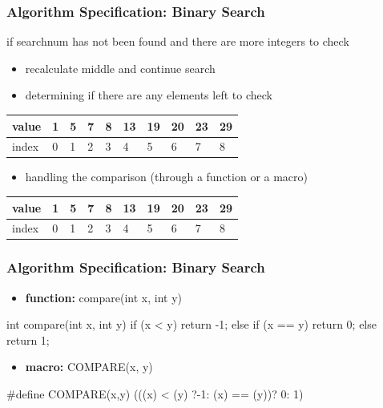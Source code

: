 \documentclass[newPxFont,sthlmFooter,nooffset]{beamer}
\begin{document}
\begin{frame}[t]
	\frametitle{Algorithm Specification: Binary Search}
	if searchnum has not been found
	and there are more integers to check
	\begin{itemize}
		\item recalculate middle and continue search
		\item determining if there are any elements left to check
	\end{itemize}
\begin{center}
	\begin{tabular}{| l | l | l | l | l | l | l | l | l | l |}
		\hline
		value & 1 & 5 & 7 & 8 & 13 & \cellcolor{green}19 & \cellcolor{yellow}20 & 23 & \cellcolor{red}29 \\
		\hline
		index & 0 & 1 & 2 & 3 & 4 & \cellcolor{green}5 & \cellcolor{yellow}6 & 7 & \cellcolor{red}8 \\
		\hline
	\end{tabular}
\end{center}
	\begin{itemize}
		\item handling the comparison (through a function or a macro)
	\end{itemize}
	\begin{center}
		\begin{tabular}{| l | l | l | l | l | l | l | l | l | l |}
			\hline
			value & 1 & 5 & 7 & 8 & 13 & 19 & 20 & \cellcolor{green}23 & \cellcolor{red}29 \\
			\hline
			index & 0 & 1 & 2 & 3 & 4 & 5 & 6 & \cellcolor{green}7 & \cellcolor{red}8 \\
			\hline
		\end{tabular}
	\end{center}
\end{frame}
\begin{frame}[t, fragile]
  \frametitle{Algorithm Specification: Binary Search}
\begin{itemize}
	\item\textbf {function:} compare(int x, int y)
\end{itemize}

\begin{codedef}
int compare(int x, int y){
	if (x < y) return -1;
	else if (x == y) return 0;
		else return 1;
}
\end{codedef}

\begin{itemize}
	\item\textbf {macro:} COMPARE(x, y)
\end{itemize}

\begin{codedef}
#define COMPARE(x,y) (((x) < (y) ?-1:  (x) == (y))? 0: 1)
\end{codedef}

\end{frame}
\end{document}
